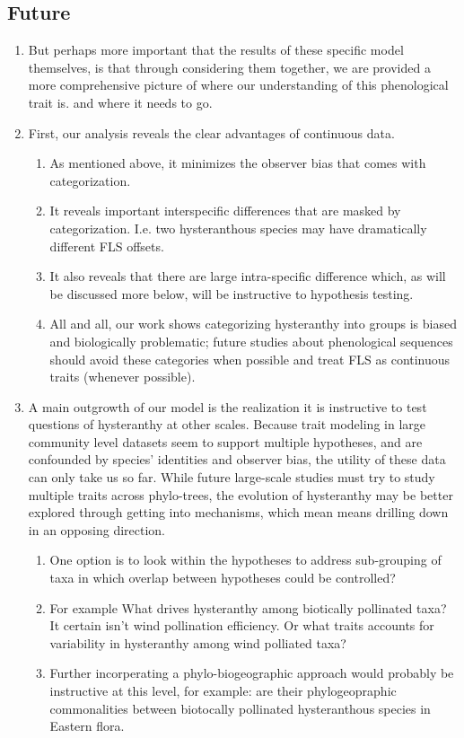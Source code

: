 \documentclass[12pt]{article}\usepackage[]{graphicx}\usepackage[]{color}
\begin{document}
\subsection*{Future}
\begin{enumerate}
\item But perhaps more important that the results of these specific model themselves, is that through considering them together, we are provided a more comprehensive picture of where our understanding of this phenological trait is. and where it needs to go. %
\item First, our analysis reveals the clear advantages of continuous data.
\begin{enumerate}
\item As mentioned above, it minimizes the observer bias that comes with categorization.
\item It reveals important interspecific differences that are masked by categorization. I.e. two hysteranthous species may have dramatically different FLS offsets.
\item It also reveals that there are large intra-specific difference which, as will be discussed more below, will be instructive to hypothesis testing.
\item All and all, our work shows categorizing hysteranthy into groups is biased and biologically problematic; future studies about phenological sequences should avoid these categories when possible and treat FLS as continuous traits (whenever possible).
\end{enumerate}
\item A main outgrowth of our model is the realization it is instructive to test questions of hysteranthy at other scales. Because trait modeling in large community level datasets seem to support multiple hypotheses, and are confounded by species' identities and observer bias, the utility of these data can only take us so far. While future large-scale studies must try to study multiple traits across phylo-trees, the evolution of hysteranthy may be better explored through getting into mechanisms, which mean means drilling down in an opposing direction. 
\begin{enumerate}
\item One option is to look within the hypotheses to address sub-grouping of taxa in which overlap between hypotheses could be controlled?
\item  For example What drives hysteranthy among biotically pollinated taxa? It certain isn't wind pollination efficiency. Or what traits accounts for variability in hysteranthy among wind polliated taxa?
\item Further incorperating a phylo-biogeographic approach would probably be instructive at this level, for example: are their phylogeopraphic commonalities between biotocally pollinated hysteranthous species in Eastern flora.
\end{enumerate}



\end{enumerate}
\end{document}
